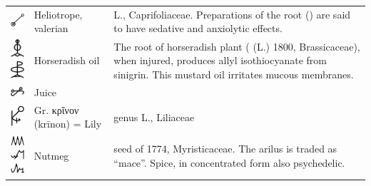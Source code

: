 \documentclass[british,final,landscape]{scrartcl}
\begin{document}
\begin{refsection}
\begin{supertabular}{p{0.3\textwidth}p{0.34\textwidth}p{0.34\textwidth}}
   \includegraphics[width=5mm]{Plant/Heliotrope} & Heliotrope, valerian &  L., Caprifoliaceae. Preparations of the root () are said to have sedative and anxiolytic effects. \\
   \includegraphics[width=5mm]{Plant/HorseraddishOil} \includegraphics[width=5mm]{Plant/HorseraddishOil2} & Horseradish oil & The root of horseradish plant ( (L.)  \num{1800}, Brassicaceae), when injured,  produces allyl isothiocyanate from sinigrin. This mustard oil irritates mucous membranes.\\
   \includegraphics[width=5mm]{Plant/Juice} & Juice & \\
   \includegraphics[width=5mm]{Plant/Lily} & Gr. \foreignlanguage{greek}{κρῖνον} (krīnon) = Lily & genus  L., Liliaceae \\
   \includegraphics[width=5mm]{Plant/Nutmeg} \includegraphics[width=5mm]{Plant/Nutmeg2} \includegraphics[width=5mm]{Plant/Nutmeg3} & Nutmeg & seed of   \num{1774}, Myristicaceae. The arilus is traded as ``mace''. Spice, in concentrated form also psychedelic. \\

\end{supertabular}
\end{refsection}
\end{document}

